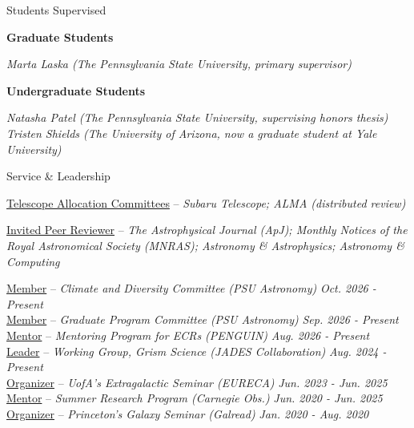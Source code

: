 \documentclass{JMH_CV}
\begin{document}

\begin{rSection}{Students Supervised}

\textbf{Graduate Students}

\textit{Marta Laska (The Pennsylvania State University, primary supervisor)}

\textbf{Undergraduate Students}

\textit{Natasha Patel (The Pennsylvania State University, supervising honors thesis)} \\
\textit{Tristen Shields (The University of Arizona, now a graduate student at Yale University)}

\end{rSection}


\begin{rSection}{Service \& Leadership}

\ul{Telescope Allocation Committees} -- \textit{Subaru
Telescope; ALMA (distributed review)}

\ul{Invited Peer Reviewer} -- \textit{The Astrophysical Journal (ApJ); Monthly Notices of the Royal Astronomical Society (\mbox{MNRAS}); Astronomy \& Astrophysics; Astronomy \& Computing}

\ul{Member} -- \textit{Climate and Diversity Committee (PSU Astronomy)} \hfill \textit{Oct. 2026 - Present} \\
\ul{Member} -- \textit{Graduate Program Committee (PSU Astronomy)} \hfill \textit{Sep. 2026 - Present} \\
\ul{Mentor} -- \textit{Mentoring Program for ECRs (PENGUIN)} \hfill \textit{Aug. 2026 - Present} \\
\ul{Leader} -- \textit{Working Group, Grism Science (JADES Collaboration)} \hfill \textit{Aug. 2024 - Present} \\
\ul{Organizer} -- \textit{UofA's Extragalactic Seminar (EURECA)} \hfill \textit{Jun. 2023 - Jun. 2025} \\
\ul{Mentor} -- \textit{Summer Research Program (Carnegie Obs.)} \hfill \textit{Jun. 2020 - Jun. 2025} \\
\ul{Organizer} -- \textit{Princeton's Galaxy Seminar (Galread)} \hfill \textit{Jan. 2020 - Aug. 2020}

\end{rSection}
\end{document}
